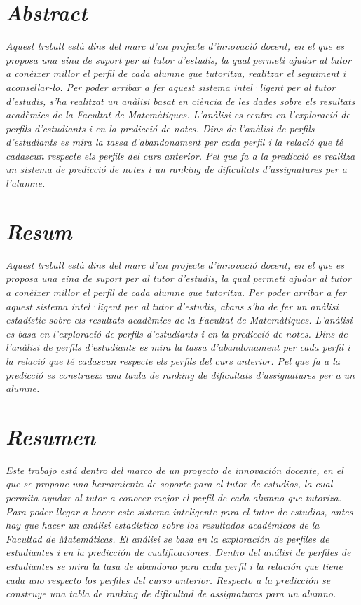 \documentclass[12pt,a4paper,catalan]{article}
\begin{document}



\section*{\textit{Abstract}}

\textit{Aquest treball està dins del marc d'un projecte d'innovació docent, en el que es proposa una eina de suport per al tutor d'estudis, la qual permeti ajudar al tutor a conèixer millor el perfil de cada alumne que tutoritza, realitzar el seguiment i aconsellar-lo. Per poder arribar a fer aquest sistema intel·ligent per al tutor d'estudis, s'ha realitzat un anàlisi basat en ciència de les dades sobre els resultats acadèmics de la Facultat de Matemàtiques. L'anàlisi es centra en l'exploració de perfils d'estudiants i en la predicció de notes. Dins de l'anàlisi de perfils d'estudiants es mira la tassa d'abandonament per cada perfil i la relació que té cadascun respecte els perfils del curs anterior. Pel que fa a la predicció es realitza un sistema de predicció de notes i un ranking de dificultats d'assignatures per a l'alumne.}

\section*{\textit{Resum}}
\textit{Aquest treball està dins del marc d'un projecte d'innovació docent, en el que es proposa una eina de suport per al tutor d'estudis, la qual permeti ajudar al tutor a conèixer millor el perfil de cada alumne que tutoritza. Per poder arribar a fer aquest sistema intel·ligent per al tutor d'estudis, abans s'ha de fer un anàlisi estadístic sobre els resultats acadèmics de la Facultat de Matemàtiques. L'anàlisi es basa en l'exploració de perfils d'estudiants i en la predicció de notes. Dins de l'anàlisi de perfils d'estudiants es mira la tassa d'abandonament per cada perfil i la relació que té cadascun respecte els perfils del curs anterior. Pel que fa a la predicció es construeix una taula de ranking de dificultats d'assignatures per a un alumne.}

\section*{\textit{Resumen}}
\textit{Este trabajo está dentro del marco de un proyecto de innovación docente, en el que se propone una herramienta de soporte para el tutor de estudios, la cual permita ayudar al tutor a conocer mejor el perfil de cada alumno que tutoriza. Para poder llegar a hacer este sistema inteligente para el tutor de estudios, antes hay que hacer un análisi estadístico sobre los resultados académicos de la Facultad de Matemáticas. El análisi se basa en la exploración de perfiles de estudiantes i en la predicción de cualificaciones. Dentro del análisi de perfiles de estudiantes se mira la tasa de abandono para cada perfil i la relación que tiene cada uno respecto los perfiles del curso anterior. Respecto a la predicción se construye una tabla de ranking de dificultad de assignaturas para un alumno.}
\end{document}

